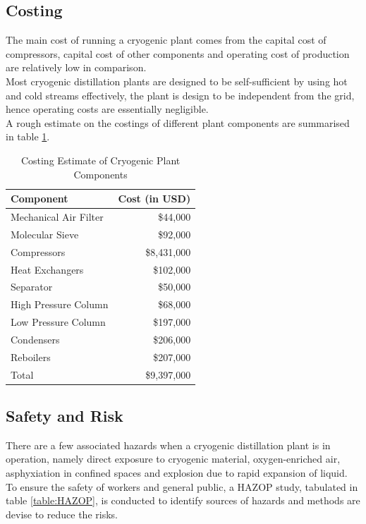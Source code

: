 \subsection{Costing} \noindent
The main cost of running a cryogenic plant comes from the capital cost of compressors, capital cost of other components and operating cost of production are relatively low in comparison. \\
Most cryogenic distillation plants are designed to be self-sufficient by using hot and cold streams effectively, the plant is design to be independent from the grid, hence operating costs are essentially negligible.\\
A rough estimate on the costings of different plant components are summarised in table \ref{table:cost}.
\begin{table}[H]
    \singlespacing
    \centering
    \caption{Costing Estimate of Cryogenic Plant Components}
    \label{table:cost}
    \begin{tabular}{|l|r|}
        \hline
        Component                               & Cost (in USD)    \\     \hline
        Mechanical Air Filter \citep{matches}   & \$44,000         \\
        Molecular Sieve \citep{couper2012}      & \$92,000         \\
        Compressors \citep{matches}             & \$8,431,000      \\
        Heat Exchangers \citep{douglas1988}     & \$102,000        \\
        Separator \citep{matches}               & \$50,000         \\
        High Pressure Column \citep{douglas1988} & \$68,000         \\
        Low Pressure Column \citep{douglas1988}  & \$197,000        \\
        Condensers \citep{douglas1988}           & \$206,000        \\
        Reboilers \citep{douglas1988}            & \$207,000        \\     \hline
        Total                 & \$9,397,000     \\     \hline
    \end{tabular}
\end{table}

\subsection{Safety and Risk} \noindent
There are a few associated hazards when a cryogenic distillation plant is in operation, namely direct exposure to cryogenic material, oxygen-enriched air, asphyxiation in confined spaces and explosion due to rapid expansion of liquid. \\
To ensure the safety of workers and general public, a HAZOP study, tabulated in table \ref{table:HAZOP}, is conducted to identify sources of hazards and methods are devise to reduce the risks.
